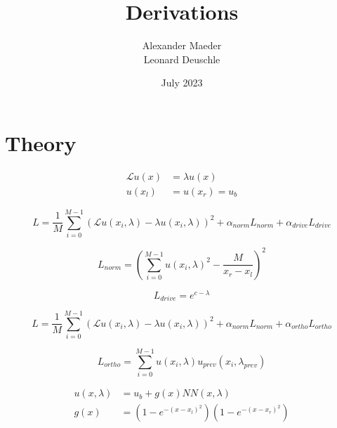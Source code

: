 \documentclass{article}
\title{Derivations}
\author{Alexander Maeder\\Leonard Deuschle}
\date{July 2023}
\begin{document}
\section{Theory}
\begin{align*}\label{eq:problemsetting}
    \mathcal{L}u\left(x\right) &= \lambda u\left(x\right)\\
    u\left(x_l\right) &= u\left(x_r\right) = u_b
\end{align*}

\begin{equation}\label{eq:loss1}
    L = \frac{1}{M} \sum \limits_{i = 0}^{M-1} \left(\mathcal{L}u\left(x_i,\lambda\right) - \lambda u\left(x_i,\lambda\right)\right)^2 + \alpha_{norm}  L_{norm} + \alpha_{drive} L_{drive}
\end{equation}

\begin{equation}\label{eq:loss_norm}
    L_{norm} = \left(\sum \limits_{i = 0}^{M-1}u\left(x_i,\lambda\right)^2  - \frac{M}{x_r - x_l}\right)^2
\end{equation}

\begin{equation}\label{eq:loss_drive}
    L_{drive} = e^{c - \lambda}
\end{equation}


\begin{equation}\label{eq:loss2}
    L = \frac{1}{M} \sum \limits_{i = 0}^{M-1} \left(\mathcal{L}u\left(x_i,\lambda\right) - \lambda u\left(x_i,\lambda\right)\right)^2 + \alpha_{norm} L_{norm} + \alpha_{ortho} L_{ortho}
\end{equation}

\begin{equation}\label{eq:loss_ortho}
    L_{ortho} = \sum \limits_{i = 0}^{M-1} u\left(x_i,\lambda\right) u_{prev}\left(x_i,\lambda_{prev}\right)
\end{equation}

\begin{align*}\label{eq:ansatz}
    u\left(x,\lambda\right) &= u_b + g\left(x\right) NN\left(x,\lambda\right)\\
    g\left(x\right) &= (1- e^{-\left(x-x_l\right)^2})(1- e^{-\left(x-x_r\right)^2})
\end{align*}
\end{document}

